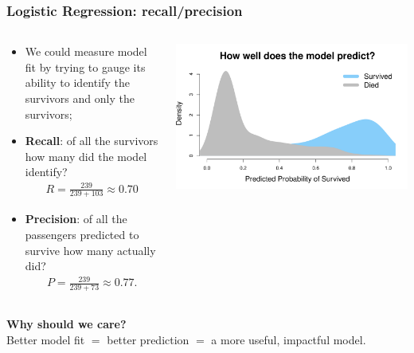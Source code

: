 \documentclass[aspectratio=169]{beamer}
\theoremstyle{principle}
\begin{document}
\begin{frame}
\frametitle{Logistic Regression: recall/precision}

\begin{columns}
\begin{column}{0.5\textwidth}

\begin{itemize}
\item We could measure model fit by trying to gauge its ability to identify the survivors and only the survivors;
\bigskip

\item \textbf{Recall}: of all the survivors how many did the model identify?
\begin{align*}
R = \frac{239}{239 + 103}\approx 0.70
\end{align*}

\item \textbf{Precision}: of all the passengers predicted to survive how many actually did?
\begin{align*}
P = \frac{239}{239 + 73} \approx 0.77.
\end{align*}
\bigskip

\end{itemize}

\end{column}
\begin{column}{0.5\textwidth}

\includegraphics[scale=0.35]{titanic_prediction_dens.pdf}

\end{column}
\end{columns}

\end{frame}

\begin{frame}

\begin{center}
\Huge\textbf{Why should we care?}\\
\bigskip
\bigskip
\large Better model fit $=$ better prediction $=$ a more useful, impactful model.\\
\end{center}

\end{frame}
\end{document}
